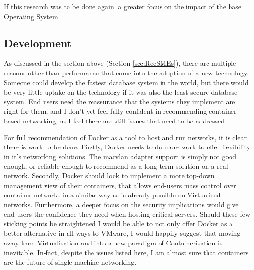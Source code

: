 If this research was to be done again, a greater focus on the impact of the base Operating System


\subsection{Development}

As discussed in the section above (Section \ref{sec:RecSMEs}), there are multiple reasons other than performance that come into the adoption of a new technology. Someone could develop the fastest database system in the world, but there would be very little uptake on the technology if it was also the least secure database system. End users need the reassurance that the systems they implement are right for them, and I don't yet feel fully confident in recommending container based networking, as I feel there are still issues that need to be addressed.

For full recommendation of Docker as a tool to host and run networks, it is clear there is work to be done. Firstly, Docker needs to do more work to offer flexibility in it's networking solutions. The macvlan adapter support is simply not good enough, or reliable enough to recommend as a long-term solution on a real network. Secondly, Docker should look to implement a more top-down management view of their containers, that allows end-users mass control over container networks in a similar way as is already possible on Virtualised networks. Furthermore, a deeper focus on the security implications would give end-users the confidence they need when hosting critical servers. Should these few sticking points be straightened I would be able to not only offer Docker as a better alternative in all ways to VMware, I would happily suggest that moving away from Virtualisation and into a new paradigm of Containerisation is inevitable. In-fact, despite the issues listed here, I am almost sure that containers are the future of single-machine networking.

